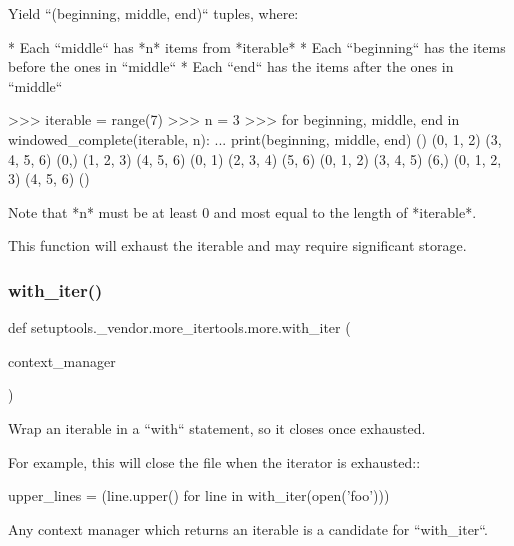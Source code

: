 \begin{DoxyVerb}Yield ``(beginning, middle, end)`` tuples, where:

* Each ``middle`` has *n* items from *iterable*
* Each ``beginning`` has the items before the ones in ``middle``
* Each ``end`` has the items after the ones in ``middle``

>>> iterable = range(7)
>>> n = 3
>>> for beginning, middle, end in windowed_complete(iterable, n):
...     print(beginning, middle, end)
() (0, 1, 2) (3, 4, 5, 6)
(0,) (1, 2, 3) (4, 5, 6)
(0, 1) (2, 3, 4) (5, 6)
(0, 1, 2) (3, 4, 5) (6,)
(0, 1, 2, 3) (4, 5, 6) ()

Note that *n* must be at least 0 and most equal to the length of
*iterable*.

This function will exhaust the iterable and may require significant
storage.
\end{DoxyVerb}
 \mbox{\label{namespacesetuptools_1_1__vendor_1_1more__itertools_1_1more_afd15440600ce48655fcc376a543f17ab}} 
\subsubsection{\texorpdfstring{with\+\_\+iter()}{with\_iter()}}
{\footnotesize\ttfamily def setuptools.\+\_\+vendor.\+more\+\_\+itertools.\+more.\+with\+\_\+iter (\begin{DoxyParamCaption}\item[{}]{context\+\_\+manager }\end{DoxyParamCaption})}

\begin{DoxyVerb}Wrap an iterable in a ``with`` statement, so it closes once exhausted.

For example, this will close the file when the iterator is exhausted::

    upper_lines = (line.upper() for line in with_iter(open('foo')))

Any context manager which returns an iterable is a candidate for
``with_iter``.\end{DoxyVerb}
 \mbox{\label{namespacesetuptools_1_1__vendor_1_1more__itertools_1_1more_aa0064ebbb74dbab5162e2411a17b9a32}} 
